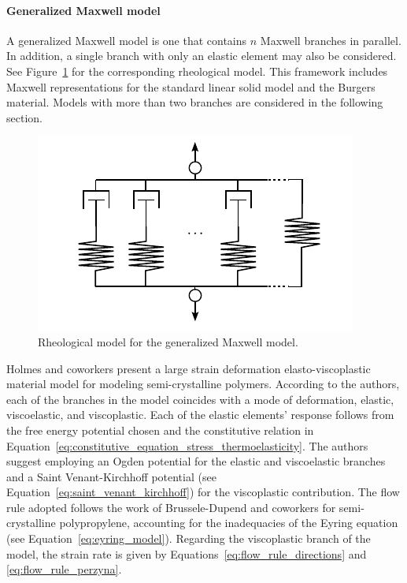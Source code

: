 \paragraph{Generalized Maxwell model}
A generalized Maxwell model is one that contains $n$ Maxwell branches in parallel.
In addition, a single branch with only an elastic element may also be considered.
See Figure~\ref{fig:rheo_model_gen_maxwell} for the corresponding rheological model.
This framework includes Maxwell representations for the standard linear solid model and the Burgers material.
Models with more than two branches are considered in the following section.
\begin{figure}[htbp]
	\centering
	\includegraphics{figures/rheo_model_gen_maxwell}
	\caption{Rheological model for the generalized Maxwell model.}
\label{fig:rheo_model_gen_maxwell}
\end{figure}

Holmes and coworkers \citep{holmesConstitutiveModelLarge2006} present a large strain deformation elasto-viscoplastic material model for modeling semi-crystalline polymers.
According to the authors, each of the branches in the model coincides with a mode of deformation, elastic, viscoelastic, and viscoplastic.
Each of the elastic elements' response follows from the free energy potential chosen and the constitutive relation in Equation~\eqref{eq:constitutive_equation_stress_thermoelasticity}.
The authors suggest employing an Ogden potential for the elastic and viscoelastic branches and a Saint Venant-Kirchhoff potential (see Equation~\eqref{eq:saint_venant_kirchhoff}) for the viscoplastic contribution.
The flow rule adopted follows the work of
Brussele-Dupend and coworkers \citep{brusselle_dupendMechanical2001, brusselle_dupendMechanical2003} for semi-crystalline polypropylene, accounting for the inadequacies of the Eyring equation (see Equation~\eqref{eq:eyring_model}).
Regarding the viscoplastic branch of the model, the strain rate is given by Equations~\eqref{eq:flow_rule_directions} and \eqref{eq:flow_rule_perzyna}.

